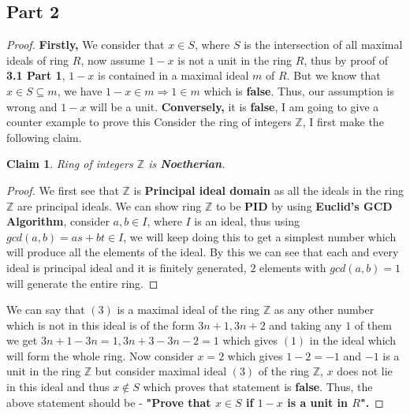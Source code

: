 \documentclass{article}
\let\bold\textbf
\newtheorem{claim}{Claim}[subsection]
\begin{document}
{  \subsection{Part 2}{
    \begin{proof}
      \bold{Firstly,} \newline
        We consider that $x \in S$, where $S$ is the intersection of all maximal ideals of ring $R$, now assume $1-x$ is not a unit in the ring $R$, thus by proof of \bold{3.1 Part 1}, $1-x$ is contained in a maximal ideal $m$ of $R$. But we know that $x \in S \subseteq m$, we have $1-x \in m \Rightarrow 1 \in m$ which is \bold{false}. \newline
        Thus, our assumption is wrong and $1-x$ will be a unit. \newline
      \bold{Conversely,} it is \bold{false}, I am going to give a counter example to prove this \newline
      Consider the ring of integers $\mathbb{Z}$, I first make the following claim.
      \begin{claim}
        Ring of integers $\mathbb{Z}$ is \bold{Noetherian}.
      \end{claim}
      \begin{proof}
        We first see that $\mathbb{Z}$ is \bold{Principal ideal domain} as all the ideals in the ring $\mathbb{Z}$ are principal ideals.
        We can show ring $\mathbb{Z}$ to be \bold{PID} by using \bold{Euclid's GCD Algorithm}, consider $a,b \in I$, where $I$ is an ideal, thus using $gcd(a,b)=as+bt \in I$, we will keep doing this to get a simplest number which will produce all the elements of the ideal. \newline
        By this we can see that each and every ideal is principal ideal and it is finitely generated, $2$ elements with $gcd(a,b)=1$ will generate the entire ring.
      \end{proof}
      We can say that $(3)$ is a maximal ideal of the ring $\mathbb{Z}$ as any other number which is not in this ideal is of the form $3n+1,3n+2$ and taking any $1$ of them we get $3n+1-3n=1,3n+3-3n-2=1$ which gives $(1)$ in the ideal which will form the whole ring. \newline
      Now consider $x=2$ which gives $1-2=-1$ and $-1$ is a unit in the ring $\mathbb{Z}$ but consider maximal ideal $(3)$ of the ring $\mathbb{Z}$, $x$ does not lie in this ideal and thus $x \notin S$ which proves that statement is \bold{false}. \newline
      Thus, the above statement should be - \bold{"Prove that $x \in S$ if $1-x$ is a unit in $R$".}
    \end{proof}
  }
}
\end{document}

